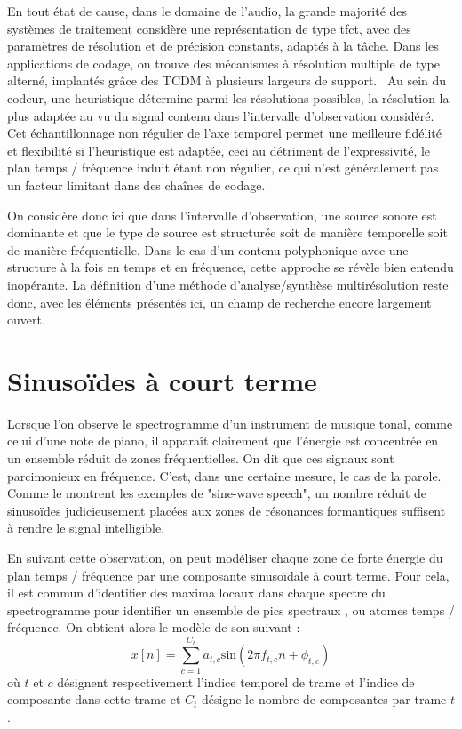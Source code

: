 En tout état de cause, dans le domaine de l'audio, la grande majorité des systèmes de traitement considère une représentation de type tfct, avec des paramètres de résolution et de précision constants, adaptés à la tâche. Dans les applications de codage, on trouve des mécanismes à résolution multiple de type alterné, implantés grâce des TCDM à plusieurs largeurs de support.~\cite{brandenburg1999mp3} Au sein du codeur, une heuristique détermine parmi les résolutions possibles, la résolution la plus adaptée au vu du signal contenu dans l'intervalle d'observation considéré. Cet échantillonnage non régulier de l'axe temporel permet une meilleure fidélité et flexibilité si l'heuristique est adaptée, ceci au détriment de l'expressivité, le plan temps / fréquence induit étant non régulier, ce qui n'est généralement pas un facteur limitant dans des chaînes de codage.

On considère donc ici que dans l'intervalle d'observation, une source sonore est dominante et que le type de source est structurée soit de manière temporelle soit de manière fréquentielle. Dans le cas d'un contenu polyphonique avec une structure à la fois en temps et en fréquence, cette approche se révèle bien entendu inopérante. La définition d'une méthode d'analyse/synthèse multirésolution reste donc, avec les éléments présentés ici, un champ de recherche encore largement ouvert.

\section{ \nmu Sinusoïdes à court terme}  \label{sec:sct}

Lorsque l'on observe le spectrogramme d'un instrument de musique tonal, comme celui d'une note de piano, il apparaît clairement que l'énergie est concentrée en un ensemble réduit de zones fréquentielles. On dit que ces signaux sont parcimonieux en fréquence. C'est, dans une certaine mesure, le cas de la parole. Comme le montrent les exemples de "sine-wave speech", un nombre réduit de sinusoïdes judicieusement placées aux zones de résonances formantiques suffisent à rendre le signal intelligible.

En suivant cette observation, on peut modéliser chaque zone de forte énergie du plan temps / fréquence par une composante sinusoïdale à court terme. Pour cela, il est commun d'identifier des maxima locaux dans chaque spectre du spectrogramme pour identifier un ensemble de \og pics spectraux \fg, ou \og atomes \fg temps / fréquence. On obtient alors le modèle de son suivant :
\begin{equation}
  x[n] = \sum_{c=1}^{C_t} a_{t, c} \mathrm{sin}(2 \pi f_{t, c} n + \phi_{t, c})
  \label{eq:sct}
\end{equation}
où $t$ et $c$ désignent respectivement l'indice temporel de trame et l'indice de composante dans cette trame et $C_t$ désigne le nombre de composantes par trame $t$.

